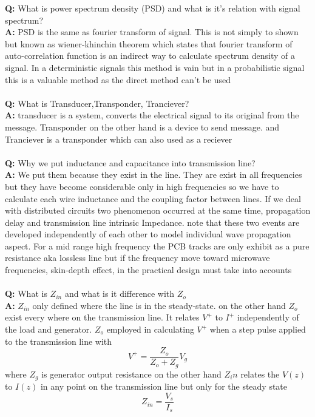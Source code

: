 \textbf{Q:} What is power spectrum density (PSD) and what is it's relation with signal spectrum?\\
\textbf{A:} PSD is the same as fourier transform of signal. This is not simply to shown but known as wiener-khinchin theorem which states that fourier transform of auto-correlation function is an indirect way to calculate spectrum density of a signal. In a deterministic signals this method is vain but in a probabilistic signal this is a valuable method as the direct method can't be used\\
\\\textbf{Q:} What is Transducer,Transponder, Tranciever?\\
\textbf{A:} transducer is a system, converts the electrical signal to its original from the message. Transponder on the other hand is a device to send message. and Tranciever is a transponder which can also used as a reciever\\
\\\textbf{Q:} Why we put inductance and capacitance into transmission line?\\
\textbf{A:} We put them because they exist in the line. They are exist in all frequencies but they have become considerable only in high frequencies so we have to calculate each wire inductance and the coupling factor between lines. If we deal with distributed circuits two phenomenon occurred at the same time, propagation delay and transmission line intrinsic Impedance. note that these two events are developed independently of each other to model individual wave propagation aspect.
For a mid range high frequency the PCB tracks are only exhibit as a pure resistance aka lossless line but if the frequency move toward microwave frequencies, skin-depth effect, in the practical design must take into accounts
\\\\\textbf{Q:} What is $Z_{in}$ and what is it difference with $Z_o$\\
\textbf{A:} $Z_{in}$ only defined where the line is in the steady-state. on the other hand $Z_o$ exist every where on the transmission line. It relates $V^+$ to $I^+$ independently of the load and generator. $Z_o$ employed in calculating $V^+$ when a step pulse applied to the transmission line with\\
$$ V^+ = \frac{Z_o}{Z_o + Z_g} V_g $$
where $Z_g$ is generator output resistance
on the other hand $Z_in$ relates the $V(z)$ to $I(z)$ in any point on the transmission line but only for the steady state\\
$$ Z_{in} = \frac{V_s}{I_s} $$
